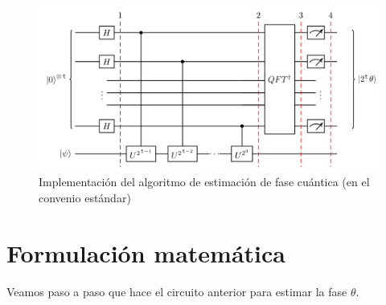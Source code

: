 \documentclass[a4paper,11pt]{book} %
\numberwithin{equation}{chapter}
\begin{document}
\begin{figure}[t]
\centering 
\includegraphics[width=0.8\linewidth]{Figuras/Fig-QPE-Circuito.png}
\caption{Implementación del algoritmo de estimación de fase cuántica (en el convenio estándar)}
\label{Fig_QPE}
\end{figure}



\section{Formulación matemática}


Veamos paso a paso que hace el circuito anterior para estimar la fase $\theta$.
\end{document}
